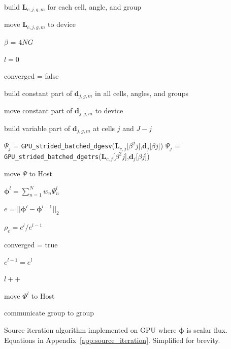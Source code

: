\begin{algorithm}
\begin{algorithmic}[1]
    \State build $\mathbf{L}_{c,j,g,m}$ for each cell, angle, and group 
    
    \State move $\mathbf{L}_{c,j,g,m}$ to device

    \State $\beta$ = $4NG$  %

    \State $l = 0$ 

    \State converged = false


    \State build constant part of $\bm{d}_{j,g,m}$ in all cells, angles, and groups 

    \State move constant part of $\bm{d}_{j,g,m}$ to device
        
         

            \State build variable part of $\bm{d}_{j,g,m}$ at cells $j$ and $J-j$  

                \State $\Psi_j$ = \texttt{GPU\_strided\_batched\_dgesv}($\mathbf{L}_{c,j}$[$\beta^{2}j$],$\bm{d}_{j}$[$\beta j$])
            \Else
                \State $\Psi_j$ = \texttt{GPU\_strided\_batched\_dgetrs}($\mathbf{L}_{c,j}$[$\beta^2j$],$\bm{d}_{j}$[$\beta j$]) 
            \EndIf
        \EndFor

        \State move $\Psi$ to Host

        \State $\bm{\phi}^l =\sum_{n=1}^{N} w _n\Psi^{l}_{n}$ 

        \State $e=||\bm{\phi}^l - \bm{\phi}^{l-1}||_2$

        \State $\rho_e = e^l / e^{l-1}$

            converged = true
        \EndIf

        \State $e^{l-1} = e^l$ 

        \State $l++$
        
        \State move $\Phi^l$ to Host

        \State communicate group to group 

    \EndWhile
    \vspace{1.5em}
    \caption{Source iteration algorithm implemented on GPU where $\bm\phi$ is scalar flux. Equations in Appendix~\ref{app:source_iteration}. Simplified for brevity.}
    \label{alg:si}
\end{algorithmic}
\end{algorithm}

